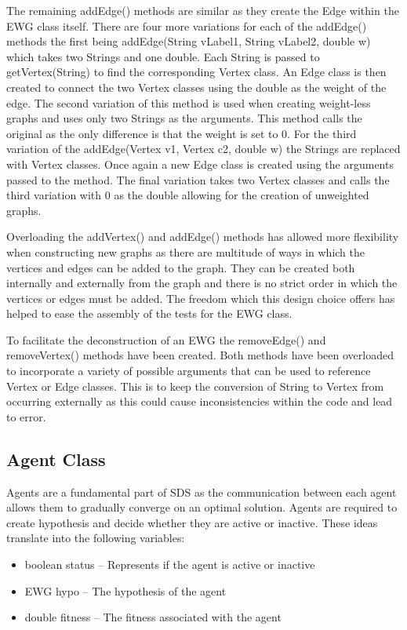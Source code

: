 \documentclass{AISB2008}
\begin{document}
The remaining addEdge() methods are similar as they create the Edge within the EWG class itself. There are four more variations for each of the addEdge() methods the first being addEdge(String vLabel1, String vLabel2, double w) which takes two Strings and one double. Each String is passed to getVertex(String) to find the corresponding Vertex class. An Edge class is then created to connect the two Vertex classes using the double as the weight of the edge. The second variation of this method is used when creating weight-less graphs and uses only two Strings as the arguments. This method calls the original as the only difference is that the weight is set to 0. For the third variation of the addEdge(Vertex v1, Vertex c2, double w) the Strings are replaced with Vertex classes. Once again a new Edge class is created using the arguments passed to the method. The final variation takes two Vertex classes and calls the third variation with 0 as the double allowing for the creation of unweighted graphs.

Overloading the addVertex() and addEdge() methods has allowed more flexibility when constructing new graphs as there are multitude of ways in which the vertices and edges can be added to the graph. They can be created both internally and externally from the graph and there is no strict order in which the vertices or edges must be added. The freedom which this design choice offers has helped to ease the assembly of the tests for the EWG class.

To facilitate the deconstruction of an EWG the removeEdge() and removeVertex() methods have been created. Both methods have been overloaded to incorporate a variety of possible arguments that can be used to reference Vertex or Edge classes. This is to keep the conversion of String to Vertex from occurring externally as this could cause inconsistencies within the code and lead to error.


\subsection{Agent Class}

Agents are a fundamental part of SDS as the communication between each agent allows them to gradually converge on an optimal solution. Agents are required to create hypothesis and decide whether they are active or inactive. These ideas translate into the following variables:

\begin{itemize}
\item boolean status – Represents if the agent is active or inactive
\item EWG hypo – The hypothesis of the agent
\item double fitness – The fitness associated with the agent
\end{itemize}
\end{document}
